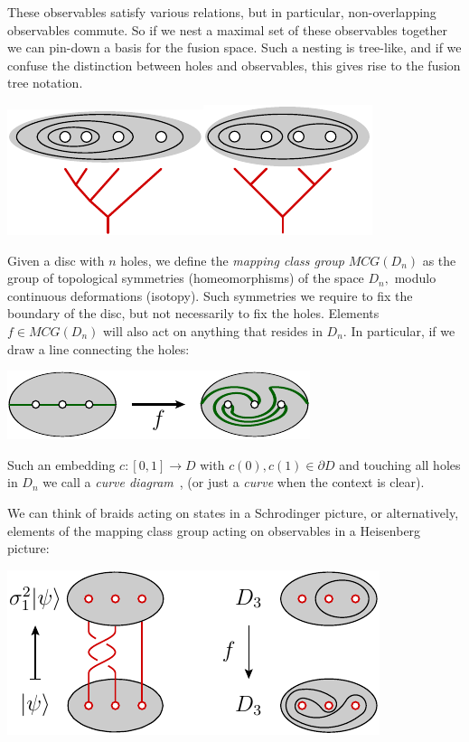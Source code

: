 \documentclass[aps, prl, letterpaper, twocolumn, superscriptaddress, notitlepage, 10pt]{revtex4-1}
\begin{document}
These observables satisfy various relations,
but in particular, non-overlapping observables commute.
So if we nest a maximal set of these observables together
we can pin-down a basis for the fusion space.
Such a nesting is tree-like, and if we confuse the distinction
between holes and observables, this gives rise to the
fusion tree notation.
\begin{center}
\includegraphics[]{pic-tree-0.pdf}\includegraphics[]{pic-tree-1.pdf}
\end{center}

Given a disc with $n$ holes, we define the \emph{mapping
class group} $MCG(D_n)$ as the group of topological
symmetries (homeomorphisms) of the space $D_n,$
modulo continuous deformations (isotopy).
Such symmetries we require to fix the boundary
of the disc, but not necessarily to fix the holes.
Elements $f\in MCG(D_n)$ will also act on anything that
resides in $D_n.$ 
In particular, if we draw a line
connecting the holes:
\begin{center}
\includegraphics[]{pic-twist.pdf}
\end{center}

Such an embedding $c : [0, 1] \to D$ with $c(0), c(1) \in \partial D$
and touching all holes in $D_n$ we call a \emph{curve diagram}~\cite{Dehornoy2002},
(or just a \emph{curve} when the context is clear).

We can think of braids acting on states in a Schrodinger picture,
or alternatively, elements of the mapping class group acting on
observables in a Heisenberg picture:
\begin{center}
\includegraphics[]{pic-interaction.pdf}
\end{center}
\end{document}
